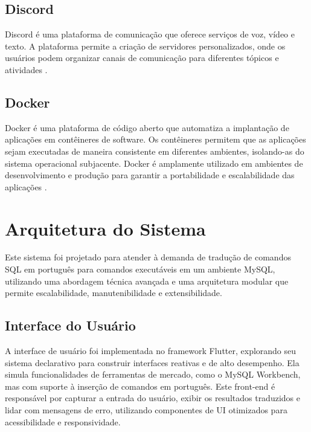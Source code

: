 \subsection{Discord}

Discord é uma plataforma de comunicação que oferece serviços de voz, vídeo e texto. A plataforma permite a criação de servidores personalizados, onde os usuários podem organizar canais de comunicação para diferentes tópicos e atividades \cite{discord2025}.

\subsection{Docker}

Docker é uma plataforma de código aberto que automatiza a implantação de aplicações em contêineres de software. Os contêineres permitem que as aplicações sejam executadas de maneira consistente em diferentes ambientes, isolando-as do sistema operacional subjacente. Docker é amplamente utilizado em ambientes de desenvolvimento e produção para garantir a portabilidade e escalabilidade das aplicações \cite{docker2025}.




\section{Arquitetura do Sistema}

Este sistema foi projetado para atender à demanda de tradução de comandos SQL em português para comandos executáveis em um ambiente MySQL, utilizando uma abordagem técnica avançada e uma arquitetura modular que permite escalabilidade, manutenibilidade e extensibilidade.

\subsection{Interface do Usuário}
A interface de usuário foi implementada no framework Flutter, explorando seu sistema declarativo para construir interfaces reativas e de alto desempenho. Ela simula funcionalidades de ferramentas de mercado, como o MySQL Workbench, mas com suporte à inserção de comandos em português. Este front-end é responsável por capturar a entrada do usuário, exibir os resultados traduzidos e lidar com mensagens de erro, utilizando componentes de UI otimizados para acessibilidade e responsividade.


